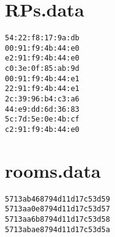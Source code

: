 \section{RPs.data}
\begin{lstlisting}
54:22:f8:17:9a:db
00:91:f9:4b:44:e0
e2:91:f9:4b:44:e0
c0:3e:0f:85:ab:9d
00:91:f9:4b:44:e1
22:91:f9:4b:44:e1
2c:39:96:b4:c3:a6
44:e9:dd:6d:36:83
5c:7d:5e:0e:4b:cf
c2:91:f9:4b:44:e0
\end{lstlisting}
\newpage

\section{rooms.data}
\begin{lstlisting}
5713ab468794d11d17c53d59
5713aa0e8794d11d17c53d57
5713aa6b8794d11d17c53d58
5713abae8794d11d17c53d5a
\end{lstlisting}
\newpage